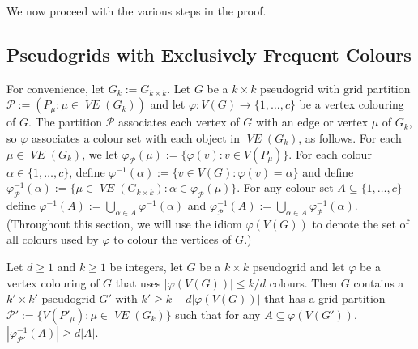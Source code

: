 \documentclass{patmorin}
\DeclareMathOperator{\VE}{\mathit{VE}}
\begin{document}
We now proceed with the various steps in the proof.


\subsection{Pseudogrids with Exclusively Frequent Colours}

For convenience, let $G_k:=G_{k\times k}$.
Let $G$ be a $k\times k$ pseudogrid with grid partition $\mathcal{P}:=(P_\mu:\mu\in\VE(G_{k}))$ and let $\varphi:V(G)\to\{1,\ldots,c\}$ be a vertex colouring of $G$.  The partition $\mathcal{P}$ associates each vertex of $G$ with an edge or vertex $\mu$ of $G_k$, so $\varphi$ associates a colour set with each object in $\VE(G_k)$, as follows.  For each $\mu\in\VE(G_{k})$, we let $\varphi_{\mathcal{P}}(\mu):=\{\varphi(v):v\in V(P_\mu)\}$.  For each colour $\alpha\in\{1,\ldots,c\}$, define $\varphi^{-1}(\alpha):=\{v\in V(G):\varphi(v)=\alpha\}$ and define $\varphi_\mathcal{P}^{-1}(\alpha):=\{\mu\in \VE(G_{k\times k}):\alpha\in\varphi_\mathcal{P}(\mu)\}$.  For any colour set $A\subseteq\{1,\ldots,c\}$ define $\varphi^{-1}(A):=\bigcup_{\alpha\in A}\varphi^{-1}(\alpha)$ and $\varphi_\mathcal{P}^{-1}(A):=\bigcup_{\alpha\in A}\varphi_{\mathcal{P}}^{-1}(\alpha)$.  (Throughout this section, we will use the idiom $\varphi(V(G))$ to denote the set of all colours used by $\varphi$ to colour the vertices of $G$.)


\begin{lem}\label{only_frequent}
  Let $d\ge 1$ and $k\ge 1$ be integers, let $G$ be a $k\times k$ pseudogrid and let $\varphi$ be a vertex colouring of $G$ that uses $|\varphi(V(G))|\le k/d$ colours.
  Then $G$ contains a $k'\times k'$ pseudogrid $G'$ with $k'\ge k - d|\varphi(V(G))|$ that has a grid-partition $\mathcal{P}':=\{V(P'_\mu):\mu\in \VE(G_{k})\}$ such that
  for any $A\subseteq \varphi(V(G'))$, $|\varphi_{\mathcal{P}'}^{-1}(A)| \ge d|A|$.
\end{lem}
\end{document}
